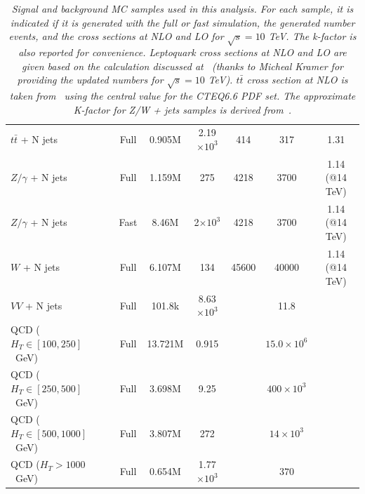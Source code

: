 \begin{table}[htb]
\begin{center}
\begin{tabular}{|l|cccccc|}
\hline
      $t\bar{t}$ + N jets         & Full      & 0.905M    &    2.19$\times 10^3$   & 414                 &  317                  & 1.31 \\
      $Z/\gamma$ + N jets         & Full      & 1.159M    &    275	           & 4218                &  3700                 & 1.14 (@14 TeV)\\
      $Z/\gamma$ + N jets         & Fast      & 8.46M     &    2$\times 10^3$      & 4218                &  3700                 & 1.14 (@14 TeV)\\
      $W$ + N jets                & Full      & 6.107M    &     134	           & 45600               &  40000                & 1.14 (@14 TeV)\\
      $VV$ + N jets               & Full      & 101.8k    &    8.63$\times 10^3$   &                     &  11.8                 & \\ \hline
      QCD ($H_T\in[100,250]$~GeV) & Full      & 13.721M   &    0.915	           &                     &  $15.0 \times 10^6$   & \\
      QCD ($H_T\in[250,500]$~GeV) & Full      & 3.698M    &    9.25	           &                     &  $400 \times 10^3$    & \\
      QCD ($H_T\in[500,1000]$~GeV)& Full      & 3.807M    &     272	           &                     &  $14 \times 10^3$     & \\
      QCD ($H_T>1000$~GeV)        & Full      & 0.654M    &    1.77$\times 10^3$   &                     &  $370$                & \\
\hline\hline
    \end{tabular}
    \caption{\small \sl Signal and background MC samples used in this analysis. For each sample, it is indicated 
      if it is generated with the full or fast simulation, the generated number events, 
      and the cross sections at NLO and LO for $\sqrt{s}=10$ TeV. 
      The k-factor is also reported for convenience. Leptoquark cross sections at NLO and LO
      are given based on the calculation discussed at~\cite{PhysRevD.71.057503} (thanks to Micheal Kramer 
      for providing the updated numbers for $\sqrt{s}=10$ TeV). $t\bar{t}$ cross section at NLO 
      is taken from~\cite{Cacciari:2008zb} using the central value for the CTEQ6.6 PDF set. 
      The approximate K-factor for Z/W + jets samples is derived from~\cite{Frixione:2004us}.}
  \end{center}
\end{table}

